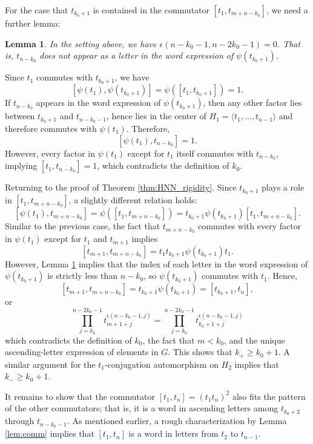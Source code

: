 \documentclass[12pt,leqno]{amsart}
\makeatletter
\renewenvironment{proof}[1][\proofname]{%
	\par
	\pushQED{\qed}%
	\normalfont
	\topsep6\p@\@plus6\p@\relax
	\trivlist
	\item[\hskip\labelsep\itshape #1\@addpunct{.}]%
	\ignorespaces
}{%
	\par\nobreak\vspace{2pt}%
	\popQED%
	\medskip%
	\endtrivlist
	\@endpefalse
}
\newcommand{\2}{L^2_{\rm per}(0, T)}
\newtheorem{lem}{Lemma}[section]
\numberwithin{equation}{section}
\numberwithin{figure}{section}
\makeatother
\begin{document}
\begin{proof}[Proof of Theorem \ref{thm:HNN_rigidity}]
    For the case that $t_{k_0+1}$ is contained in the commutator $[t_1,t_{m+n-k_0}]$, we need a further lemma:
    \begin{lem}\label{lem:not_contain}
        In the setting above, we have $\epsilon(n-k_0-1, n-2k_0-1) = 0$. That is, $t_{n-k_0}$ does not appear as a letter in the word expression of $\psi(t_{k_0+1})$. 
    \end{lem}
    \begin{proof}
        Since $t_1$ commutes with $t_{k_0+1}$, we have
        \[
            [\psi(t_1),\psi(t_{k_0+1})] = \psi([t_1,t_{k_0+1}]) = 1.
        \]
        If $t_{n-k_0}$ appears in the word expression of $\psi(t_{k_0+1})$, then any other factor lies between $t_{k_0+1}$ and $t_{n-k_0-1}$, hence lies in the center of $H_1 = \langle t_1,\dots, t_{n-1}\rangle$ and therefore commutes with $\psi(t_1)$. Therefore,
        \[
        [\psi(t_1),t_{n-k_0}] = 1.
        \]
        However, every factor in $\psi(t_1)$ except for $t_1$ itself commutes with $t_{n-k_0}$, implying $[t_1,t_{n-k_0}] = 1$, which contradicts the definition of $k_0$.
    \end{proof}
    Returning to the proof of Theorem \ref{thm:HNN_rigidity}. Since $t_{k_0+1}$ plays a role in $[t_1,t_{m+n-k_0}]$, a slightly different relation holds:
    \[
        [\psi(t_1),t_{m+n-k_0}] = \psi([t_1,t_{m+n-k_0}]) = t_{k_0+1}\psi(t_{k_0+1})[t_1,t_{m+n-k_0}].
    \]
    Similar to the previous case, the fact that $t_{m+n-k_0}$ commutes with every factor in $\psi(t_1)$ except for $t_1$ and $t_{m+1}$ implies
    \[
        [t_{m+1},t_{m+n-k_0}] = t_1t_{k_0+1}\psi(t_{k_0+1})t_1.
    \]
    However, Lemma \ref{lem:not_contain} implies that the index of each letter in the word expression of $\psi(t_{k_0+1})$ is strictly less than $n-k_0$, so $\psi(t_{k_0+1})$ commutes with $t_1$. Hence,
    \[
    [t_{m+1},t_{m+n-k_0}] = t_{k_0+1}\psi(t_{k_0+1}) = [t_{k_0+1},t_n],
    \]
    or
    \[
    \prod_{j=k_0}^{n-2k_0-1}t_{m+1+j}^{\epsilon(n-k_0-1,j)} = \prod_{j=k_0}^{n-2k_0-1}t_{k_0+1+j}^{\epsilon(n-k_0-1,j)}
    \]
    which contradicts the definition of $k_0$, the fact that $m<k_0$, and the unique ascending-letter expression of elements in $G$. This shows that $k_+\geq k_0+1$. A similar argument for the $t_1$-conjugation automorphism on $H_2$ implies that $k_-\geq k_0+1$.
    
    It remains to show that the commutator $[t_1,t_n] = (t_1t_n)^2$ also fits the pattern of the other commutators; that is, it is a word in ascending letters among $t_{k_0+2}$ through $t_{n-k_0-1}$. As mentioned earlier, a rough characterization by Lemma \ref{lem:comm} implies that $[t_1,t_n]$ is a word in letters from $t_2$ to $t_{n-1}$.


\end{proof}
\end{document}
